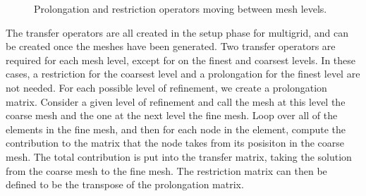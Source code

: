 \begin{figure}[h]
	\centering
	
	\caption{\label{fig:pro_res_ops} Prolongation and restriction operators moving between mesh levels.}
\end{figure}

The transfer operators are all created in the setup phase for multigrid, and can be created once the meshes have been generated.
Two transfer operators are required for each mesh level, except for on the finest and coarsest levels.
In these cases, a restriction for the coarsest level and a prolongation for the finest level are not needed.
For each possible level of refinement, we create a prolongation matrix.
Consider a given level of refinement and call the mesh at this level the coarse mesh and the one at the next level the fine mesh.
Loop over all of the elements in the fine mesh, and then for each node in the element, compute the contribution to the matrix that the node takes from its posisiton in the coarse mesh.
The total contribution is put into the transfer matrix, taking the solution from the coarse mesh to the fine mesh.
The restriction matrix can then be defined to be the transpose of the prolongation matrix.





